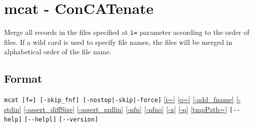 
%

\section{mcat - ConCATenate\label{sect:mcat}}
Merge all records in the files specified at \verb|i=| parameter according to the order of files. If a wild card is used to specify file names, the files will be merged in alphabetical order of the file name. 

\subsection*{Format}
\verb/mcat [f=] [-skip_fnf] [-nostop|-skip|-force]/
\hyperref[sect:option_i]{[i=]}
\hyperref[sect:option_o]{[o=]}
\hyperref[sect:option_add_fname]{[-add\_fname]}
\hyperref[sect:option_-stdin]{[-stdin]}
\hyperref[sect:option_assert_diffSize]{[-assert\_diffSize]}
\hyperref[sect:option_assert_nullin]{[-assert\_nullin]}
\hyperref[sect:option_nfn]{[-nfn]} 
\hyperref[sect:option_nfno]{[-nfno]}  
\hyperref[sect:option_x]{[-x]}
\hyperref[sect:option_q]{[-q]}
\hyperref[sect:option_option_tmppath]{[tmpPath=]}
\verb|[--help]|
\verb|[--helpl]|
\verb|[--version]|\\

